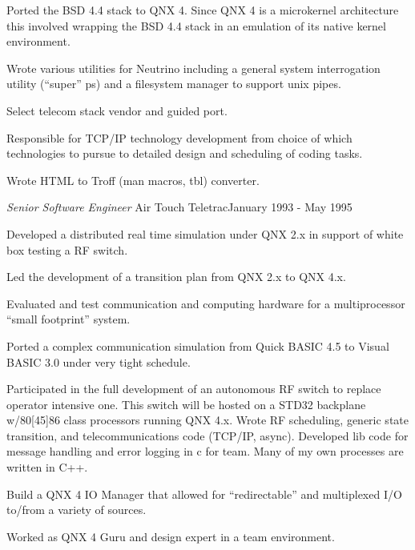 \documentclass[margin]{res}
\begin{document}
\begin{resume}
                Ported the BSD 4.4 stack to QNX 4. Since QNX 4 is a
                microkernel architecture this involved wrapping the
                BSD 4.4 stack in an emulation of its native kernel
                environment.

                Wrote various utilities for Neutrino including a general
                system interrogation utility (“super” ps) and a
                filesystem manager to support unix pipes.

                Select telecom stack vendor and guided port.

                Responsible for TCP/IP technology development from choice
                of which technologies to pursue to detailed design and
                scheduling of coding tasks.

                Wrote HTML to Troff (man macros, tbl) converter.

                {\sl\large Senior Software Engineer } Air Touch Teletrac\hfill January 1993 - May 1995

                Developed a distributed real time simulation under QNX
                2.x in support of white box testing a RF switch.

                Led the development of a transition plan from QNX 2.x
                to QNX 4.x.

                Evaluated and test communication and computing hardware
                for a multiprocessor “small footprint” system.

                Ported a complex communication simulation from Quick
                BASIC 4.5 to Visual BASIC 3.0 under very tight schedule.

                Participated in the full development of an autonomous RF
                switch to replace operator intensive one. This switch
                will be hosted on a STD32 backplane w/80[45]86 class
                processors running QNX 4.x. Wrote RF scheduling, generic
                state transition, and telecommunications code (TCP/IP,
                async). Developed lib code for message handling and
                error logging in c for team. Many of my own processes
                are written in C++.

                Build a QNX 4 IO Manager that allowed for
                “redirectable” and multiplexed I/O to/from a variety
                of sources.

                Worked as QNX 4 Guru and design expert in a team
                environment.


\end{resume}
\end{document}
